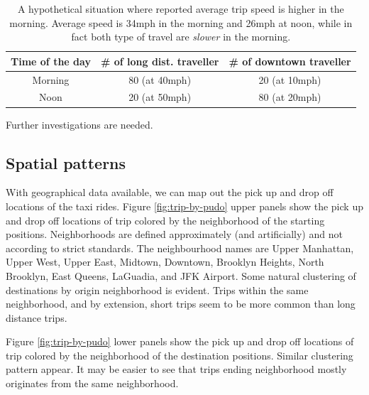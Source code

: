 \documentclass[10pt,a4paper]{article} %
\begin{document}
{    \begin{table}
    \begin{center}
        \begin{tabular}{ c  c  c }
            \hline
            \textbf{Time of the day} & \textbf{\# of long dist. traveller}  & \textbf{\# of downtown traveller} \\ \hline
            Morning         & 80 (at 40mph)     & 20 (at 10mph)\\ \hline
            Noon            & 20 (at 50mph)     & 80 (at 20mph)\\
            \hline
        \end{tabular}
        \caption{A hypothetical situation where reported average trip speed is higher in the morning. Average speed is 34mph in the morning and 26mph at noon, while in fact both type of travel are \emph{slower} in the morning.}
        \label{table:simpsons}
    \end{center}
    \end{table}
    
    Further investigations are needed.
    
    \subsection{Spatial patterns}
    
    With geographical data available, we can map out the pick up and drop off locations of the taxi rides.
    Figure \ref{fig:trip-by-pudo} upper panels show the pick up and drop off locations of trip colored by the neighborhood of the starting positions. Neighborhoods are defined approximately (and artificially) and not according to strict standards. The neighbourhood names are Upper Manhattan, Upper West, Upper East, Midtown, Downtown, Brooklyn Heights, North Brooklyn, East Queens, LaGuadia, and JFK Airport. Some natural clustering of destinations by origin neighborhood is evident. Trips within the same neighborhood, and by extension, short trips seem to be more common than long distance trips.
    
    Figure \ref{fig:trip-by-pudo} lower panels show the pick up and drop off locations of trip colored by the neighborhood of the destination positions. Similar clustering pattern appear. It may be easier to see that trips ending neighborhood mostly originates from the same neighborhood.\\
    

}
\end{document}
